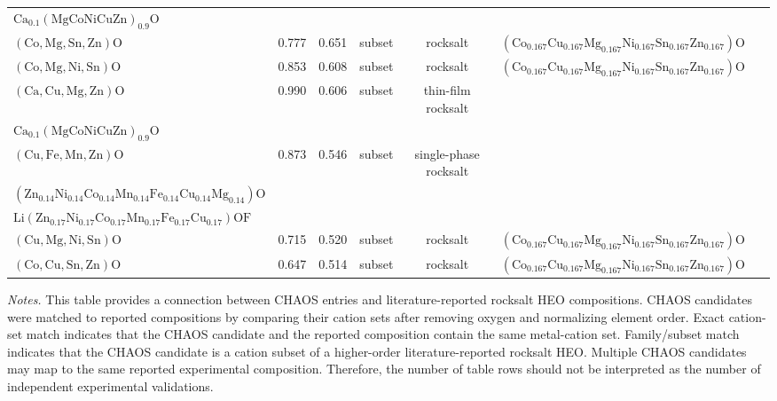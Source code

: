 \begin{table}
{\begin{tabular}{lcccccr}
{$\mathrm{Ca}_{0.1}(\mathrm{MgCoNiCuZn})_{0.9}\mathrm{O}$} & ~\cite{Furst_MisfitCation_JournaloftheAmericanCeramicSociety_2026} \\
$(\mathrm{Co},\mathrm{Mg},\mathrm{Sn},\mathrm{Zn})\mathrm{O}$ & 0.777 & 0.651 & subset & rocksalt & $(\mathrm{Co}_{0.167}\mathrm{Cu}_{0.167}\mathrm{Mg}_{0.167}\mathrm{Ni}_{0.167}\mathrm{Sn}_{0.167}\mathrm{Zn}_{0.167})\mathrm{O}$ & ~\cite{Braun_ESO_AdvMat_2018} \\
$(\mathrm{Co},\mathrm{Mg},\mathrm{Ni},\mathrm{Sn})\mathrm{O}$ & 0.853 & 0.608 & subset & rocksalt & $(\mathrm{Co}_{0.167}\mathrm{Cu}_{0.167}\mathrm{Mg}_{0.167}\mathrm{Ni}_{0.167}\mathrm{Sn}_{0.167}\mathrm{Zn}_{0.167})\mathrm{O}$ & ~\cite{Braun_ESO_AdvMat_2018} \\
$(\mathrm{Ca},\mathrm{Cu},\mathrm{Mg},\mathrm{Zn})\mathrm{O}$ & 0.990 & 0.606 & subset & thin-film rocksalt & \makecell{$\mathrm{Ca}_{0.04}(\mathrm{MgCoNiCuZn})_{0.96}\mathrm{O}$\\
$\mathrm{Ca}_{0.1}(\mathrm{MgCoNiCuZn})_{0.9}\mathrm{O}$} & ~\cite{Furst_MisfitCation_JournaloftheAmericanCeramicSociety_2026} \\
$(\mathrm{Cu},\mathrm{Fe},\mathrm{Mn},\mathrm{Zn})\mathrm{O}$ & 0.873 & 0.546 & subset & single-phase rocksalt & \makecell{$(\mathrm{Zn}_{0.17}\mathrm{Ni}_{0.17}\mathrm{Co}_{0.17}\mathrm{Mn}_{0.17}\mathrm{Fe}_{0.17}\mathrm{Cu}_{0.17})\mathrm{O}$\\ $(\mathrm{Zn}_{0.14}\mathrm{Ni}_{0.14}\mathrm{Co}_{0.14}\mathrm{Mn}_{0.14}\mathrm{Fe}_{0.14}\mathrm{Cu}_{0.14}\mathrm{Mg}_{0.14})\mathrm{O}$\\
$\mathrm{Li}(\mathrm{Zn}_{0.17}\mathrm{Ni}_{0.17}\mathrm{Co}_{0.17}\mathrm{Mn}_{0.17}\mathrm{Fe}_{0.17}\mathrm{Cu}_{0.17})\mathrm{OF}$}  & \cite{Lin_MechanochemicalSynthesis_JournalofMaterialsScience_2020} \\
$(\mathrm{Cu},\mathrm{Mg},\mathrm{Ni},\mathrm{Sn})\mathrm{O}$ & 0.715 & 0.520 & subset & rocksalt & $(\mathrm{Co}_{0.167}\mathrm{Cu}_{0.167}\mathrm{Mg}_{0.167}\mathrm{Ni}_{0.167}\mathrm{Sn}_{0.167}\mathrm{Zn}_{0.167})\mathrm{O}$ & ~\cite{Braun_ESO_AdvMat_2018} \\
$(\mathrm{Co},\mathrm{Cu},\mathrm{Sn},\mathrm{Zn})\mathrm{O}$ & 0.647 & 0.514 & subset & rocksalt & $(\mathrm{Co}_{0.167}\mathrm{Cu}_{0.167}\mathrm{Mg}_{0.167}\mathrm{Ni}_{0.167}\mathrm{Sn}_{0.167}\mathrm{Zn}_{0.167})\mathrm{O}$ & ~\cite{Braun_ESO_AdvMat_2018} \\
\bottomrule
\end{tabular}
}
\footnotesize
\textit{Notes.} This table provides a connection between CHAOS entries and literature-reported rocksalt HEO compositions. CHAOS candidates were matched to reported compositions by comparing their cation sets after removing oxygen and normalizing element order. Exact cation-set match indicates that the CHAOS candidate and the reported composition contain the same metal-cation set. Family/subset match indicates that the CHAOS candidate is a cation subset of a higher-order literature-reported rocksalt HEO. Multiple CHAOS candidates may map to the same reported experimental composition. Therefore, the number of table rows should not be interpreted as the number of independent experimental validations.
\label{tab:candidate_table_2}
\end{table}
